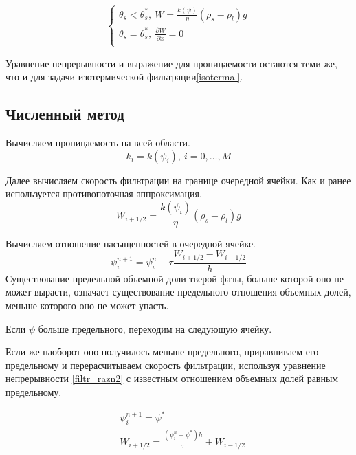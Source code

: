 \documentclass[12pt,a4paper]{article}
\newcommand{\pd}[2]{\frac{\partial #1}{\partial #2}}
\begin{document}
\begin{equation}
\begin{cases}
\theta_s < \theta_s^*,\  W = \frac{k(\psi)}{\eta} (\rho_s - \rho_l) g\\
\theta_s = \theta_s^*,\  \pd{W}{x} = 0\\
\end{cases}
\end{equation}

Уравнение непрерывности и выражение для проницаемости остаются теми же, что и для задачи изотермической фильтрации\eqref{isotermal}.

\subsection{Численный метод}
Вычисляем проницаемость на всей области.
\begin{equation}
k_i = k(\psi_i) , \ i = 0,  \dots ,M
\label{perm_razn2}
\end{equation}

Далее вычисляем скорость фильтрации на границе очередной ячейки. Как и ранее используется противопоточная аппроксимация.
\begin{equation}
W_{i+1/2} = \frac{k(\psi_i)}{\eta}(\rho_s-\rho_l)g
\label{Darsi_razn2}
\end{equation}

Вычисляем отношение насыщенностей в очередной ячейке. 
\begin{equation}
\psi_i^{n+1} = \psi_i^n - \tau\frac{W_{i+1/2} - W_{i-1/2}}{h}
\label{filtr_razn2}
\end{equation}
Существование предельной объемной доли тверой фазы, больше которой оно не может вырасти, означает существование предельного отношения объемных долей, меньше которого оно не может упасть.

Если $\psi$ больше предельного, переходим на следующую ячейку.

Если же наоборот оно получилось меньше предельного, приравниваем его предельному и перерасчитываем скорость фильтрации, используя уравнение непрерывности \eqref{filtr_razn2} с известным отношением объемных долей равным предельному.

\begin{equation}
\begin{aligned} 
&\psi_{i}^{n+1} = \psi^* \\
&W_{i+1/2} = \frac{(\psi_i^n - \psi^*)h}{\tau} + W_{i-1/2} \\
\end{aligned}
\label{corr_razn}
\end{equation}
\end{document}
